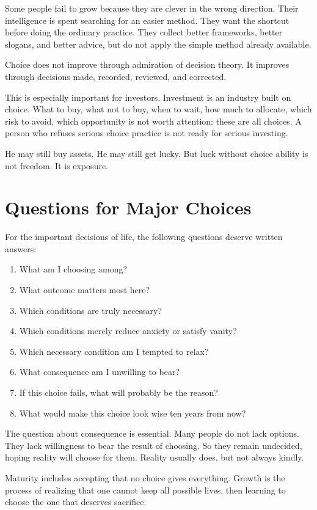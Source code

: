 Some people fail to grow because they are clever in the wrong direction. Their intelligence is spent searching for an easier method. They want the shortcut before doing the ordinary practice. They collect better frameworks, better slogans, and better advice, but do not apply the simple method already available.

Choice does not improve through admiration of decision theory. It improves through decisions made, recorded, reviewed, and corrected.

This is especially important for investors. Investment is an industry built on choice. What to buy, what not to buy, when to wait, how much to allocate, which risk to avoid, which opportunity is not worth attention: these are all choices. A person who refuses serious choice practice is not ready for serious investing.

He may still buy assets. He may still get lucky. But luck without choice ability is not freedom. It is exposure.

\section*{Questions for Major Choices}

For the important decisions of life, the following questions deserve written answers:

\begin{enumerate}
\item What am I choosing among?
\item What outcome matters most here?
\item Which conditions are truly necessary?
\item Which conditions merely reduce anxiety or satisfy vanity?
\item Which necessary condition am I tempted to relax?
\item What consequence am I unwilling to bear?
\item If this choice fails, what will probably be the reason?
\item What would make this choice look wise ten years from now?
\end{enumerate}

The question about consequence is essential. Many people do not lack options. They lack willingness to bear the result of choosing. So they remain undecided, hoping reality will choose for them. Reality usually does, but not always kindly.

Maturity includes accepting that no choice gives everything. Growth is the process of realizing that one cannot keep all possible lives, then learning to choose the one that deserves sacrifice.

